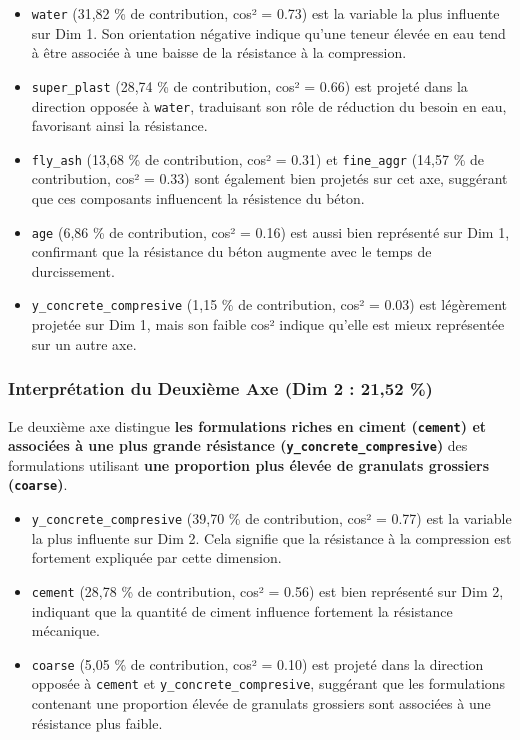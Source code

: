 \documentclass[
  12pt,
]{article}
\providecommand{\tightlist}{%
  \setlength{\itemsep}{0pt}\setlength{\parskip}{0pt}}
\begin{document}
\begin{itemize}
\tightlist
\item
  \texttt{water} (31,82 \% de contribution, cos² = 0.73) est la variable
  la plus influente sur Dim 1. Son orientation négative indique qu'une
  teneur élevée en eau tend à être associée à une baisse de la
  résistance à la compression.
\item
  \texttt{super\_plast} (28,74 \% de contribution, cos² = 0.66) est
  projeté dans la direction opposée à \texttt{water}, traduisant son
  rôle de réduction du besoin en eau, favorisant ainsi la résistance.
\item
  \texttt{fly\_ash} (13,68 \% de contribution, cos² = 0.31) et
  \texttt{fine\_aggr} (14,57 \% de contribution, cos² = 0.33) sont
  également bien projetés sur cet axe, suggérant que ces composants
  influencent la résistence du béton.
\item
  \texttt{age} (6,86 \% de contribution, cos² = 0.16) est aussi bien
  représenté sur Dim 1, confirmant que la résistance du béton augmente
  avec le temps de durcissement.
\item
  \texttt{y\_concrete\_compresive} (1,15 \% de contribution, cos² =
  0.03) est légèrement projetée sur Dim 1, mais son faible cos² indique
  qu'elle est mieux représentée sur un autre axe.
\end{itemize}

\subsubsection{Interprétation du Deuxième Axe (Dim 2 : 21,52
\%)}\label{interpruxe9tation-du-deuxiuxe8me-axe-dim-2-2152}

Le deuxième axe distingue \textbf{les formulations riches en ciment
(\texttt{cement}) et associées à une plus grande résistance
(\texttt{y\_concrete\_compresive})} des formulations utilisant
\textbf{une proportion plus élevée de granulats grossiers
(\texttt{coarse})}.

\begin{itemize}
\tightlist
\item
  \texttt{y\_concrete\_compresive} (39,70 \% de contribution, cos² =
  0.77) est la variable la plus influente sur Dim 2. Cela signifie que
  la résistance à la compression est fortement expliquée par cette
  dimension.
\item
  \texttt{cement} (28,78 \% de contribution, cos² = 0.56) est bien
  représenté sur Dim 2, indiquant que la quantité de ciment influence
  fortement la résistance mécanique.
\item
  \texttt{coarse} (5,05 \% de contribution, cos² = 0.10) est projeté
  dans la direction opposée à \texttt{cement} et
  \texttt{y\_concrete\_compresive}, suggérant que les formulations
  contenant une proportion élevée de granulats grossiers sont associées
  à une résistance plus faible.
\end{itemize}
\end{document}
